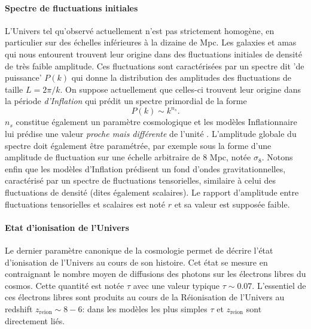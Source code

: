 \paragraph{Spectre de fluctuations initiales} L'Univers tel qu'observé actuellement n'est pas strictement homogène, en particulier sur des échelles inférieures à la dizaine de Mpc. Les galaxies et amas qui nous entourent trouvent leur origine dans des fluctuations initiales de densité de très faible amplitude. Ces fluctuations sont caractérisées par un spectre dit 'de puissance'  $P(k)$ qui donne la distribution des amplitudes des fluctuations de taille $L=2\pi/k$. On suppose actuellement que celles-ci trouvent leur origine dans la période \textit{d'Inflation} qui prédit un spectre primordial de la forme  
\begin{equation}
P(k)\sim  k^{n_s}.
\end{equation} 
$n_s$ constitue également un paramètre cosmologique et les modèles Inflationnaire lui prédise une valeur \textit{proche mais différente} de l'unité . L'amplitude globale du spectre doit également être paramétrée, par exemple sous la forme d'une amplitude de fluctuation sur une échelle arbitraire de 8 Mpc, notée $\sigma_8$. Notons enfin que les modèles d'Inflation prédisent un fond d'ondes gravitationnelles, caractérisé par un spectre de fluctuations tensorielles, similaire à celui des fluctuations de densité (dites également scalaires). Le rapport d'amplitude entre fluctuations tensorielles et scalaires est noté $r$ et sa valeur est supposée faible.

\paragraph{Etat d'ionisation de l'Univers} Le dernier paramètre canonique de la cosmologie permet de décrire l'état d'ionisation  de l'Univers au cours de son histoire. Cet état se mesure en  contraignant le nombre moyen de diffusions des photons sur les électrons libres du cosmos. Cette quantité est notée $\tau$ avec une valeur typique $\tau \sim 0.07$. L'essentiel de ces électrons libres sont produits au cours de la Réionisation  de l'Univers au redshift $z_\mathrm{reion}\sim 8-6$: dans les modèles les plus simples $\tau$ et $z_\mathrm{reion}$ sont directement liés.

